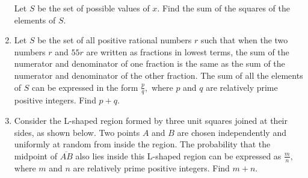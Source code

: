 \documentclass{article}
\begin{document}
\begin{enumerate}[label=\arabic*., itemsep=0.5em]
Let $S$ be the set of possible values of $x.$ Find the sum of the squares of the elements of $S.$\par \vspace{0.5em}\item Let $S$ be the set of all positive rational numbers $r$ such that when the two numbers $r$ and $55r$ are written as fractions in lowest terms, the sum of the numerator and denominator of one fraction is the same as the sum of the numerator and denominator of the other fraction. The sum of all the elements of $S$ can be expressed in the form $\frac{p}{q},$ where $p$ and $q$ are relatively prime positive integers. Find $p+q.$\par \vspace{0.5em}\item Consider the L-shaped region formed by three unit squares joined at their sides, as shown below. Two points $A$ and $B$ are chosen independently and uniformly at random from inside the region. The probability that the midpoint of $\overline{AB}$ also lies inside this L-shaped region can be expressed as $\frac{m}{n},$ where $m$ and $n$ are relatively prime positive integers. Find $m+n.$


\end{enumerate}
\end{document}
